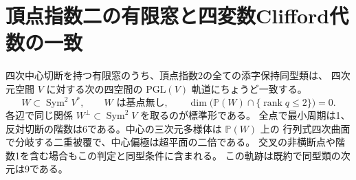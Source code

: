 \section{頂点指数二の有限窓と四変数Clifford代数の一致}
\label{sec:index-two-central-clifford}
\begin{theorem}\label{thm:index-two-central-clifford}
四次中心切断を持つ有限窓のうち、頂点指数2の全ての添字保持同型類は、
四次元空間 $V$ に対する次の四空間の $\mathrm{PGL}(V)$ 軌道にちょうど一致する。
\[
 W\subset\operatorname{Sym}^2V^*,\qquad
 \text{$W$ は基点無し},\qquad
 \dim\big(\mathbb P(W)\cap\{\operatorname{rank}q\le2\}\big)=0 .
\]
各辺で同じ関係 $W^\perp\subset\operatorname{Sym}^2V$ を取るのが標準形である。
全点で最小周期は1、反対切断の階数は6である。中心の三次元多様体は $\mathbb P(W)$ 上の
行列式四次曲面で分岐する二重被覆で、中心偏極は超平面の二倍である。
交叉の非横断点や階数1を含む場合もこの判定と同型条件に含まれる。
この軌跡は既約で同型類の次元は9である。
\end{theorem}
